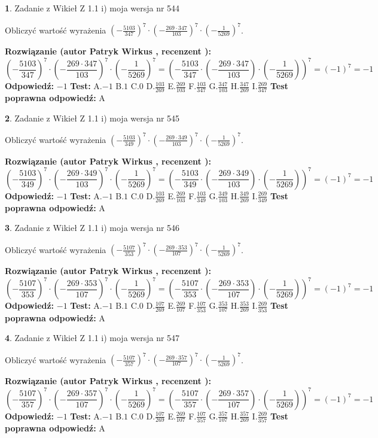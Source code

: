 \documentclass[12pt, a4paper]{article}
\theoremstyle{definition} %
\newtheorem{zad}{}
\newcommand{\zadStart}[1]{\begin{zad}#1\newline}
\newcommand{\zadStop}{\end{zad}}
\newcommand{\rozwStart}[2]{\noindent \textbf{Rozwiązanie (autor #1 , recenzent #2): }\newline}
\newcommand{\rozwStop}{\newline}
\newcommand{\odpStart}{\noindent \textbf{Odpowiedź:}\newline}
\newcommand{\odpStop}{\newline}
\newcommand{\testStart}{\noindent \textbf{Test:}\newline}
\newcommand{\testStop}{\newline}
\newcommand{\kluczStart}{\noindent \textbf{Test poprawna odpowiedź:}\newline}
\newcommand{\kluczStop}{\newline}
\begin{document}
\zadStart{Zadanie z Wikieł Z 1.1 i) moja wersja nr 544}

Obliczyć wartość wyrażenia $(-\frac{5103}{347})^{7} \cdot (-\frac{269 \cdot 347}{103})^{7} \cdot (-\frac{1}{5269})^{7}$.
\zadStop
\rozwStart{Patryk Wirkus}{}
$$(-\frac{5103}{347})^{7} \cdot (-\frac{269 \cdot 347}{103})^{7} \cdot (-\frac{1}{5269})^{7} = (-\frac{5103}{347} \cdot (-\frac{269 \cdot 347}{103}) \cdot (-\frac{1}{5269}))^{7} = (-1)^{7} = -1$$
\rozwStop
\odpStart
$-1$
\odpStop
\testStart
A.$-1$ B.$1$ C.$0$ D.$\frac{103}{269}$ E.$\frac{269}{103}$
F.$\frac{103}{347}$ G.$\frac{347}{103}$
H.$\frac{347}{269}$
I.$\frac{269}{347}$
\testStop
\kluczStart
A
\kluczStop



\zadStart{Zadanie z Wikieł Z 1.1 i) moja wersja nr 545}

Obliczyć wartość wyrażenia $(-\frac{5103}{349})^{7} \cdot (-\frac{269 \cdot 349}{103})^{7} \cdot (-\frac{1}{5269})^{7}$.
\zadStop
\rozwStart{Patryk Wirkus}{}
$$(-\frac{5103}{349})^{7} \cdot (-\frac{269 \cdot 349}{103})^{7} \cdot (-\frac{1}{5269})^{7} = (-\frac{5103}{349} \cdot (-\frac{269 \cdot 349}{103}) \cdot (-\frac{1}{5269}))^{7} = (-1)^{7} = -1$$
\rozwStop
\odpStart
$-1$
\odpStop
\testStart
A.$-1$ B.$1$ C.$0$ D.$\frac{103}{269}$ E.$\frac{269}{103}$
F.$\frac{103}{349}$ G.$\frac{349}{103}$
H.$\frac{349}{269}$
I.$\frac{269}{349}$
\testStop
\kluczStart
A
\kluczStop



\zadStart{Zadanie z Wikieł Z 1.1 i) moja wersja nr 546}

Obliczyć wartość wyrażenia $(-\frac{5107}{353})^{7} \cdot (-\frac{269 \cdot 353}{107})^{7} \cdot (-\frac{1}{5269})^{7}$.
\zadStop
\rozwStart{Patryk Wirkus}{}
$$(-\frac{5107}{353})^{7} \cdot (-\frac{269 \cdot 353}{107})^{7} \cdot (-\frac{1}{5269})^{7} = (-\frac{5107}{353} \cdot (-\frac{269 \cdot 353}{107}) \cdot (-\frac{1}{5269}))^{7} = (-1)^{7} = -1$$
\rozwStop
\odpStart
$-1$
\odpStop
\testStart
A.$-1$ B.$1$ C.$0$ D.$\frac{107}{269}$ E.$\frac{269}{107}$
F.$\frac{107}{353}$ G.$\frac{353}{107}$
H.$\frac{353}{269}$
I.$\frac{269}{353}$
\testStop
\kluczStart
A
\kluczStop



\zadStart{Zadanie z Wikieł Z 1.1 i) moja wersja nr 547}

Obliczyć wartość wyrażenia $(-\frac{5107}{357})^{7} \cdot (-\frac{269 \cdot 357}{107})^{7} \cdot (-\frac{1}{5269})^{7}$.
\zadStop
\rozwStart{Patryk Wirkus}{}
$$(-\frac{5107}{357})^{7} \cdot (-\frac{269 \cdot 357}{107})^{7} \cdot (-\frac{1}{5269})^{7} = (-\frac{5107}{357} \cdot (-\frac{269 \cdot 357}{107}) \cdot (-\frac{1}{5269}))^{7} = (-1)^{7} = -1$$
\rozwStop
\odpStart
$-1$
\odpStop
\testStart
A.$-1$ B.$1$ C.$0$ D.$\frac{107}{269}$ E.$\frac{269}{107}$
F.$\frac{107}{357}$ G.$\frac{357}{107}$
H.$\frac{357}{269}$
I.$\frac{269}{357}$
\testStop
\kluczStart
A
\kluczStop
\end{document}
